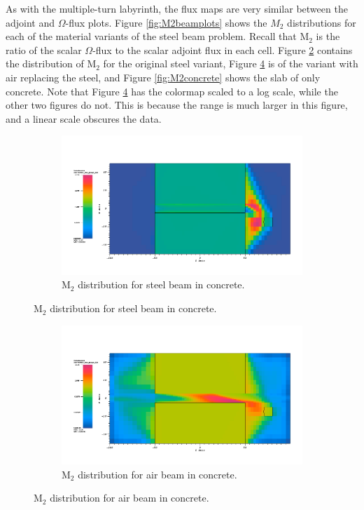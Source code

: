 As with the multiple-turn
labyrinth, the flux maps are very similar between the adjoint and $\Omega$-flux
plots. Figure \ref{fig:M2beamplots} shows the
$M_2$ distributions for each of the material variants of the steel beam problem.
Recall that M$_2$ is the ratio of the scalar $\Omega$-flux
to the scalar adjoint flux in each cell. 
Figure \ref{fig:M2steel} contains the distribution of M$_2$ for the original
steel variant, Figure \ref{fig:M2air} is of the variant with air replacing the
steel, and Figure \ref{fig:M2concrete} shows the slab of only concrete. Note that Figure \ref{fig:M2air} has the
colormap scaled to a log scale, while the other two figures do not. This is
because the range is much larger in this figure, and a linear scale obscures the
data.

\begin{figure}[htb!]
  \centering
  \begin{subfigure}[t]{\textwidth}
    \includegraphics[width=0.9\linewidth]{./chapters/characterization_probs/figures/char/prob_1/prob1M2G26.png}
    \caption{M$_2$ distribution for steel beam in concrete.}
    \label{fig:M2steel}
  \end{subfigure}
\end{figure}
\begin{figure}[htb!]\ContinuedFloat
  \centering
  \begin{subfigure}[t]{\textwidth}
    \includegraphics[width=0.9\linewidth]{./chapters/characterization_probs/figures/char/prob1v1/prob1v1M2G026log.png}
    \caption{M$_2$ distribution for air beam in concrete.}
    \label{fig:M2air}
  \end{subfigure}
\end{figure}
